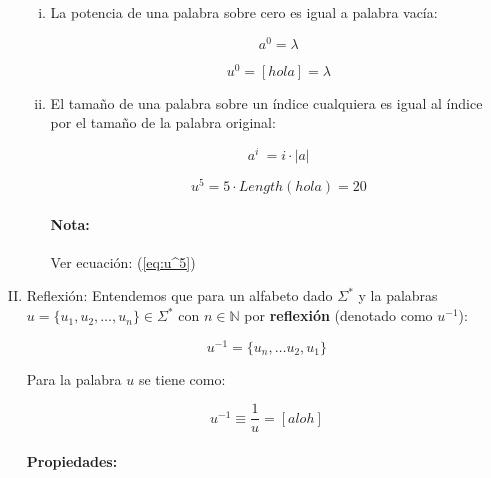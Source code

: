 \begin{enumerate}[I.]
{\begin{enumerate}[i.]
\begin{equation} \label{eq:u^5}
u^2\cdot u^3 = [holahola]\cdot[holaholahola] \equiv u^5 =
[holaholaholaholahola]
\end{equation}

\item La potencia de una palabra sobre cero es igual a palabra vacía:

\begin{equation}
a^0 = \lambda
\end{equation}

\ejem

\begin{equation}
u^0 = [hola] = \lambda
\end{equation}

\item El tamaño de una palabra sobre un índice cualquiera es igual al índice por
el tamaño de la palabra original:

\begin{equation}
a^i\ = i \cdot |a|
\end{equation}

\ejem

\begin{equation}
u^5 = 5 \cdot Length(hola) = 20
\end{equation}
\paragraph*{Nota:} Ver ecuación: (\ref{eq:u^5})

\end{enumerate}

}\item {}Reflexión: Entendemos que para un alfabeto dado $\Sigma^*$ y la palabras 
$u = \{u_1, u_2, \ldots, u_n\} \in \Sigma^*$ con $n \in \mathbb{N}$ por 
\textbf{reflexión} (denotado como $u^{-1}$): {

\begin{equation}
u^{-1} = \{u_n, \ldots u_2, u_1\}
\end{equation}

\ejem Para la palabra $u$ se tiene como:

\begin{equation}
u^{-1} \equiv \frac{1}{u} = [aloh]
\end{equation}

\paragraph*{Propiedades:}

}
\end{enumerate}

